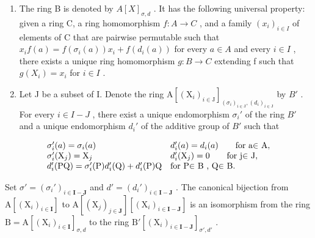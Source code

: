 \begin{enumerate}
\def\labelenumi{\alph{enumi})}
\setcounter{enumi}{1}
\item
  The ring B is denoted by \(A[X]_{\sigma,d}\) . It has the following universal property: given a ring C, a ring homomorphism \(f: A \to C\) , and a family \((x_i)_{i \in I}\) of elements of C that are pairwise permutable such that \(x_i f(a) = f(\sigma_i(a)) x_i + f(d_i(a))\) for every \(a \in A\) and every \(i \in I\) , there exists a unique ring homomorphism \(g: B \to C\) extending f such that \(g(X_i) = x_i\) for \(i \in I\) .
\item
  Let J be a subset of I. Denote the ring \(\mathrm{A}[(\mathrm{X}_{i})_{i\in\mathrm{J}}]_{(\sigma_{i})_{i\in\mathrm{J}},(d_{i})_{i\in\mathrm{J}}}\) by \(B'\) . For every \(i\in I-J\) , there exist a unique endomorphism \(\sigma_{i}'\) of the ring \(B'\) and a unique endomorphism \(d_{i}'\) of the additive group of \(B'\) such that
\end{enumerate}

\[
\begin{array}{l l} \sigma_ {i} ^ {\prime} (a) = \sigma_ {i} (a) & d _ {i} ^ {\prime} (a) = d _ {i} (a) \qquad \text {for a\ensuremath{\in} A}, \\ \sigma_ {i} ^ {\prime} (\mathrm{X} _ {j}) = \mathrm{X} _ {j} & d _ {i} ^ {\prime} (\mathrm{X} _ {j}) = 0 \qquad \text {for j\ensuremath{\in} J}, \\ d _ {i} ^ {\prime} (\mathrm{PQ}) = \sigma_ {i} ^ {\prime} (\mathrm{P}) d _ {i} ^ {\prime} (\mathrm{Q}) + d _ {i} ^ {\prime} (\mathrm{P}) \mathrm{Q} & \text {for P\ensuremath{\in} B , Q\ensuremath{\in} B}. \end{array}
\]

Set \(\sigma' = (\sigma_i')_{i \in \mathbf{I} - \mathbf{J}}\) and \(d' = (d_i')_{i \in \mathbf{I} - \mathbf{J}}\) . The canonical bijection from \(\mathrm{A}[(\mathrm{X}_i)_{i \in \mathbf{I}}]\) to \(\mathrm{A}[(\mathrm{X}_j)_{j \in \mathbf{J}}][(\mathrm{X}_i)_{i \in \mathbf{I} - \mathbf{J}}]\) is an isomorphism from the ring \(\mathrm{B} = \mathrm{A}[(\mathrm{X}_i)_{i \in \mathbf{I}}]_{\sigma, d}\) to the ring \(\mathrm{B}'[(\mathrm{X}_i)_{i \in \mathbf{I} - \mathbf{J}}]_{\sigma', d'}\) .

